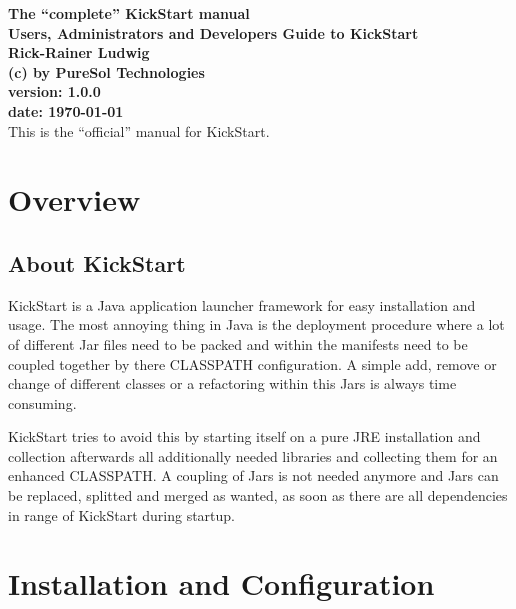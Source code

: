 \documentclass[a4paper,10pt]{book}
\newcommand{\TITLE}{The ``complete'' KickStart manual}
\newcommand{\SUBTITLE}{Users, Administrators and Developers Guide to 
KickStart}
\newcommand{\AUTHOR}{Rick-Rainer Ludwig}
\newcommand{\DATE}{\today}
\newcommand{\VERSION}{1.0.0}
\newcommand{\COMPANY}{PureSol Technologies}
\begin{document}
\pagestyle{headings}

\newcommand{\bs}{\textbackslash}

\begin{titlepage}
	{
	\centering
	\textbf{\Huge \TITLE}\\[1cm]
	\textbf{\Large \SUBTITLE}\\[2cm]
	\textbf{\AUTHOR}\\
	\textbf{(c) by \COMPANY}\\[1cm]
	\textbf{version: \VERSION}\\
	\textbf{date: \DATE}\\[1cm]
	}
        This is the ``official'' manual for KickStart.
\end{titlepage}

\tableofcontents
\listoffigures
\listoftables

\part{Overview}
\chapter{About KickStart}
KickStart is a Java application launcher framework for easy installation and usage. The most annoying thing in Java is the deployment procedure where a lot
of different Jar files need to be packed and within the manifests need to be coupled together by there CLASSPATH configuration. A simple add, remove or change of different classes or a refactoring within this Jars is always time consuming.

KickStart tries to avoid this by starting itself on a pure JRE installation and collection afterwards all additionally needed libraries and collecting them for an enhanced CLASSPATH. A coupling of Jars is not needed anymore and Jars can be replaced, splitted and merged as wanted, as soon as there are all dependencies in range of KickStart during startup.

\part{Installation and Configuration}
\end{document}
